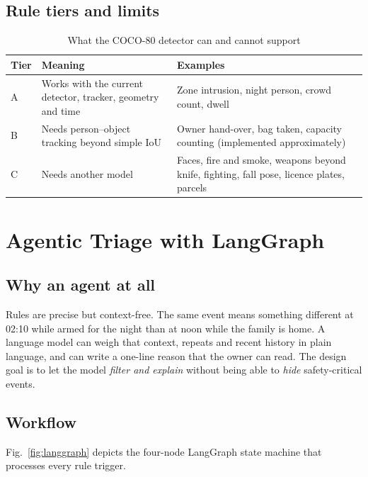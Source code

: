 \documentclass[11pt]{article}
\DeclareRobustCommand{\code}[1]{\texttt{\detokenize{#1}}}
\begin{document}
\subsection{Rule tiers and limits}

\begin{table}[H]
\centering\small
\caption{What the COCO-80 detector can and cannot support}
\label{tab:ieee_20}
\begin{tabularx}{\textwidth}{|L{2.0cm}|Y|Y|}
\hline
{} \textbf{Tier} & \textbf{Meaning} & \textbf{Examples} \\ \hline
A & Works with the current detector, tracker, geometry and time & Zone intrusion, night person, crowd count, dwell \\ \hline
B & Needs person--object tracking beyond simple IoU & Owner hand-over, bag taken, capacity counting (implemented approximately) \\ \hline
C & Needs another model & Faces, fire and smoke, weapons beyond knife, fighting, fall pose, licence plates, parcels \\ \hline
\end{tabularx}
\end{table}

\section{Agentic Triage with LangGraph}

\subsection{Why an agent at all}

Rules are precise but context-free. The same \code{person_in_zone} event means something different at 02:10 while armed for the night than at noon while the family is home. A language model can weigh that context, repeats and recent history in plain language, and can write a one-line reason that the owner can read. The design goal is to let the model \emph{filter and explain} without being able to \emph{hide} safety-critical events.

\subsection{Workflow}

Fig.~\ref{fig:langgraph} depicts the four-node LangGraph state machine that processes every rule trigger.
\end{document}

